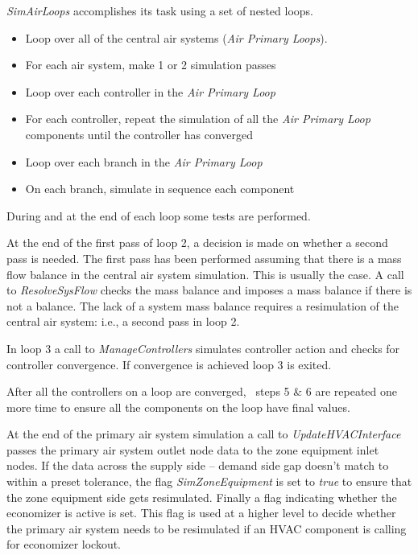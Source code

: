 \emph{SimAirLoops} accomplishes its task using a set of nested loops.

\begin{itemize}
\item
  Loop over all of the central air systems (\emph{Air Primary Loops}).
\item
  For each air system, make 1 or 2 simulation passes
\item
  Loop over each controller in the \emph{Air Primary Loop}
\item
  For each controller, repeat the simulation of all the \emph{Air Primary Loop} components until the controller has converged
\item
  Loop over each branch in the \emph{Air Primary Loop}
\item
  On each branch, simulate in sequence each component
\end{itemize}

During and at the end of each loop some tests are performed.

At the end of the first pass of loop 2, a decision is made on whether a second pass is needed. The first pass has been performed assuming that there is a mass flow balance in the central air system simulation. This is usually the case. A call to \emph{ResolveSysFlow} checks the mass balance and imposes a mass balance if there is not a balance. The lack of a system mass balance requires a resimulation of the central air system: i.e., a second pass in loop 2.

In loop 3 a call to \emph{ManageControllers} simulates controller action and checks for controller convergence. If convergence is achieved loop 3 is exited.

After all the controllers on a loop are converged,~ steps 5 \& 6 are repeated one more time to ensure all the components on the loop have final values.

At the end of the primary air system simulation a call to \emph{UpdateHVACInterface} passes the primary air system outlet node data to the zone equipment inlet nodes. If the data across the supply side -- demand side gap doesn't match to within a preset tolerance, the flag \emph{SimZoneEquipment} is set to \emph{true} to ensure that the zone equipment side gets resimulated. Finally a flag indicating whether the economizer is active is set. This flag is used at a higher level to decide whether the primary air system needs to be resimulated if an HVAC component is calling for economizer lockout.
